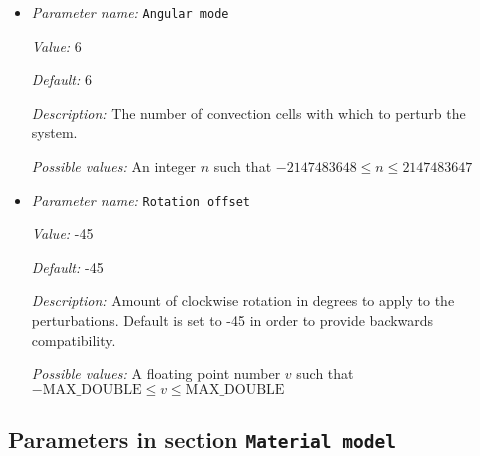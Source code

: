 \begin{itemize}
\item {\it Parameter name:} {\tt Angular mode}
\label{parameters:Initial temperature model/Spherical hexagonal perturbation/Angular mode}


{\it Value:} 6


{\it Default:} 6


{\it Description:} The number of convection cells with which to perturb the system.


{\it Possible values:} An integer $n$ such that $-2147483648\leq n \leq 2147483647$
\item {\it Parameter name:} {\tt Rotation offset}
\label{parameters:Initial temperature model/Spherical hexagonal perturbation/Rotation offset}


{\it Value:} -45


{\it Default:} -45


{\it Description:} Amount of clockwise rotation in degrees to apply to the perturbations. Default is set to -45 in order to provide backwards compatibility.


{\it Possible values:} A floating point number $v$ such that $-\text{MAX\_DOUBLE} \leq v \leq \text{MAX\_DOUBLE}$
\end{itemize}

\subsection{Parameters in section \tt Material model}
\label{parameters:Material_20model}

